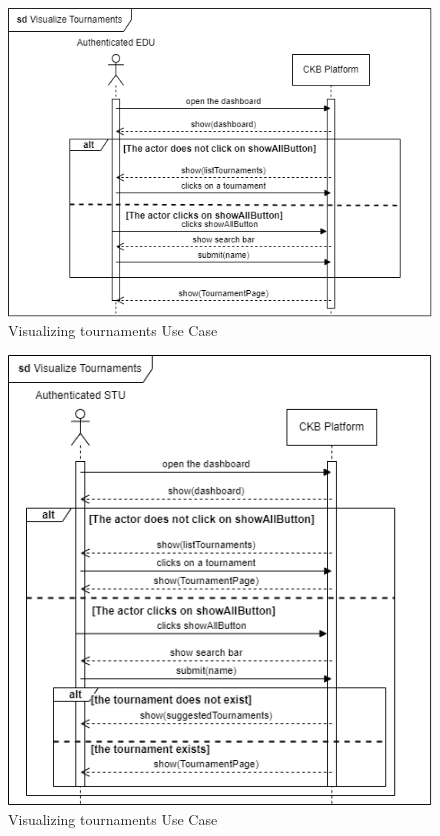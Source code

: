 \begin{figure}[H]
    \centering
    \includegraphics[width=1\textwidth]{images/sequence_diagrams/ClassDiagram-UC15.1-SequenceDiagram.png}
    \caption{Visualizing tournaments Use Case}
    \label{fig:uc15.1}
\end{figure}
\begin{figure}[H]
    \centering
    \includegraphics[width=1\textwidth]{images/sequence_diagrams/ClassDiagram-UC15.2-SequenceDiagram.png}
    \caption{Visualizing tournaments Use Case}
    \label{fig:uc15.2}
\end{figure}
